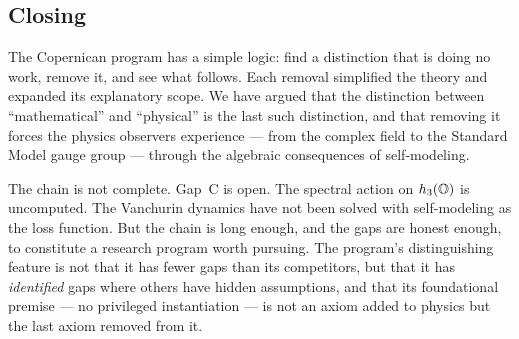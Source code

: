 \subsection{Closing}
\label{subsec:closing}

The Copernican program has a simple logic: find a distinction that is
doing no work, remove it, and see what follows.  Each removal
simplified the theory and expanded its explanatory scope.  We have
argued that the distinction between ``mathematical'' and ``physical''
is the last such distinction, and that removing it forces the physics
observers experience --- from the complex field to the Standard Model
gauge group --- through the algebraic consequences of self-modeling.

The chain is not complete.  Gap~C is open.  The spectral action on
$h_3(\mathbb{O})$ is uncomputed.  The Vanchurin dynamics have not been solved
with self-modeling as the loss function.  But the chain is long enough,
and the gaps are honest enough, to constitute a research program worth
pursuing.  The program's distinguishing feature is not that it has
fewer gaps than its competitors, but that it has \emph{identified}
gaps where others have hidden assumptions, and that its foundational
premise --- no privileged instantiation --- is not an axiom added to
physics but the last axiom removed from it.
